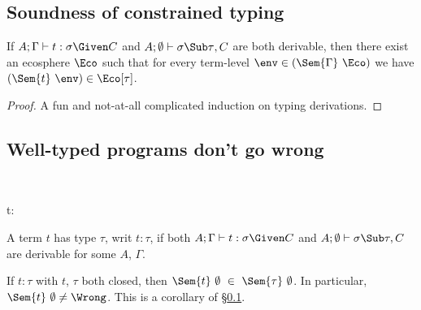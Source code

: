 \documentclass{amsart}
\theoremstyle{definition}
\begin{document}
\subsection{Soundness of constrained typing}
\label{consound}
If
$A;\Gamma\vdash t : \sigma\Given C$ and
$A;\emptyset\vdash{\sigma\Sub\tau},C$
are both derivable, then there exist an ecosphere $\Eco$ such
that for every term-level $\env\in(\Sem{\Gamma}~\Eco)$ we have
$(\Sem{t}~\env)\in\Eco[\tau]$.

\begin{proof}
A fun and not-at-all complicated induction on typing derivations.
\end{proof}

\subsection{Well-typed programs don't go wrong}~

{t:\tau}

A term $t$ has type $\tau$, writ $t:\tau$, if both
$A;\Gamma\vdash t : \sigma\Given C$ and
$A;\emptyset\vdash\sigma\Sub\tau,C$ are derivable for some $A$,
$\Gamma$.

If $t:\tau$ with $t$, $\tau$ both closed, then
$\Sem{t}~\emptyset~\in~\Sem{\tau}~\emptyset$. In particular,
$\Sem{t}~\emptyset\neq\Wrong$. This is a corollary of
\S\ref{consound}.




\end{document}

